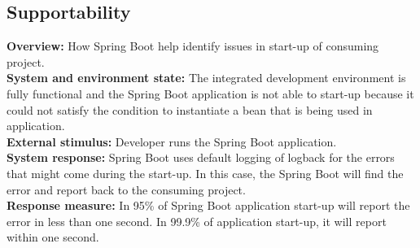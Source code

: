 \subsection*{Supportability}

\textbf{Overview:} How Spring Boot help identify issues in start-up of consuming project. \\

\textbf{System and environment state:} The integrated development environment is fully functional and the Spring Boot application is not able to start-up because it could not satisfy the condition to instantiate a bean that is being used in application. \\

\textbf{External stimulus:} Developer runs the Spring Boot application. \\

\textbf{System response:} Spring Boot uses default logging of logback for the errors that might come during the start-up. In this case, the Spring Boot will find the error and report back to the consuming project. \\

\textbf{Response measure:} In 95\% of Spring Boot application start-up will report the error in less than one second. In 99.9\% of application start-up, it will report within one second.